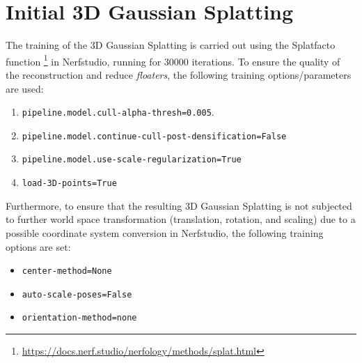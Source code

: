 \section{Initial 3D Gaussian Splatting} \label{sec:3dgs_initial}
The training of the 3D Gaussian Splatting is carried out using the Splatfacto function \footnote{\url{https://docs.nerf.studio/nerfology/methods/splat.html}} in Nerfstudio, running for 30000 iterations. To ensure the quality of the reconstruction and reduce \textit{floaters}, the following training options/parameters are used:
\begin{enumerate}[noitemsep]
	\item \texttt{pipeline.model.cull-alpha-thresh=0.005}.
	\item \texttt{pipeline.model.continue-cull-post-densification=False}
	\item \texttt{pipeline.model.use-scale-regularization=True}
	\item \texttt{load-3D-points=True}
\end{enumerate}

Furthermore, to ensure that the resulting 3D Gaussian Splatting is not subjected to further world space transformation (translation, rotation, and scaling) due to a possible coordinate system conversion in Nerfstudio, the following training options are set:

\begin{itemize}[noitemsep]
	\item \texttt{center-method=None }
	\item \texttt{auto-scale-poses=False}
	\item \texttt{orientation-method=none}
\end{itemize}

